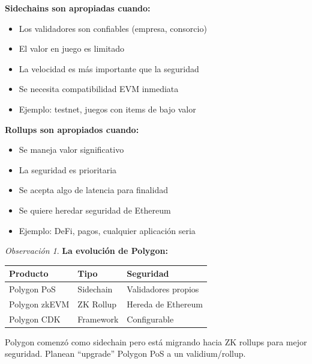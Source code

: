 \documentclass[11pt,a4paper,twoside,openright]{book}
\theoremstyle{definition}
\theoremstyle{plain}
\theoremstyle{remark}
\newtheorem{remark}{Observación}[chapter]
\begin{document}
\begin{keyidea}
\textbf{Sidechains son apropiadas cuando:}
\begin{itemize}
    \item Los validadores son confiables (empresa, consorcio)
    \item El valor en juego es limitado
    \item La velocidad es más importante que la seguridad
    \item Se necesita compatibilidad EVM inmediata
    \item Ejemplo: testnet, juegos con items de bajo valor
\end{itemize}

\textbf{Rollups son apropiados cuando:}
\begin{itemize}
    \item Se maneja valor significativo
    \item La seguridad es prioritaria
    \item Se acepta algo de latencia para finalidad
    \item Se quiere heredar seguridad de Ethereum
    \item Ejemplo: DeFi, pagos, cualquier aplicación seria
\end{itemize}
\end{keyidea}

\begin{remark}
\textbf{La evolución de Polygon:}

\begin{center}
\begin{tabular}{lll}
\toprule
\textbf{Producto} & \textbf{Tipo} & \textbf{Seguridad} \\
\midrule
Polygon PoS & Sidechain & Validadores propios \\
Polygon zkEVM & ZK Rollup & Hereda de Ethereum \\
Polygon CDK & Framework & Configurable \\
\bottomrule
\end{tabular}
\end{center}

Polygon comenzó como sidechain pero está migrando hacia ZK rollups para mejor seguridad. Planean ``upgrade'' Polygon PoS a un validium/rollup.
\end{remark}
\end{document}
